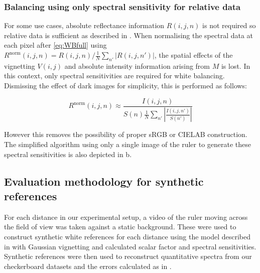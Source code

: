 % 
% 
%     
%    
%     
%     

% 
%    
%    
%    
%    
%     
%   

% 
%  
%     
%     
%    
% 
%    
%    
%  
%     
%     
%     

% 
%                       
% 
% 

%

\subsubsection{Balancing using only spectral sensitivity for relative data}
\label{algorithmrelative}
For some use cases, absolute reflectance information $R(i,j,n)$ is not required so relative data is sufficient as described in .
When normalising the spectral data at each pixel after \eqref{eq:WBfull} using \newline $R^{\textrm{norm}}(i,j,n) = R(i,j,n) / \frac{1}{N}\sum_{n'}|R(i,j,n')|$, the spatial effects of the vignetting $V(i,j)$ and absolute intensity information arising from $M$ is lost.
In this context, only spectral sensitivities are required for white balancing.
Dismissing the effect of dark images for simplicity, this is performed as follows:
\begin{linenomath*}
\begin{equation}
    R^{\textrm{norm}}(i,j,n) \approx \frac{I(i,j,n)}{S(n) \frac{1}{N}\sum_{n'}|\frac{I(i,j,n')}{S(n')}|} 
\end{equation}
\end{linenomath*}
However this removes the possibility of proper sRGB or CIELAB construction.
%
%
%
%
The simplified algorithm using only a single image of the ruler to generate these spectral sensitivities is also depicted in b. 

\subsection{Evaluation methodology for synthetic references}
\label{methodsynthetic}
For each distance in our experimental setup, a video of the ruler moving across the field of view was taken against a static background.
These were used to construct synthetic white references for each distance using the model described in  with Gaussian vignetting and calculated scalar factor and spectral sensitivities.
%
Synthetic references were then used to reconstruct quantitative spectra from our checkerboard datasets and the errors calculated as in 
%
.

